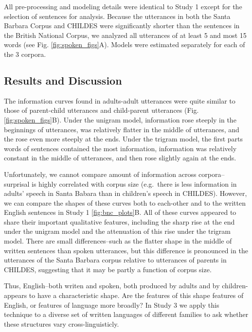 \documentclass[10pt, letterpaper]{article}
\begin{document}
All pre-processing and modeling details were identical to Study 1 except
for the selection of sentences for analysis. Because the utterances in
both the Santa Barbara Corpus and CHILDES were significantly shorter
than the sentences in the British National Corpus, we analyzed all
utterances of at least 5 and most 15 words (see Fig.
\ref{fig:spoken_figs}A). Models were estimated separately for each of
the 3 corpora.

\hypertarget{results-and-discussion-1}{%
\subsection{Results and Discussion}\label{results-and-discussion-1}}

The information curves found in adults-adult utterances were quite
similar to those of parent-child utterances and child-parent utterances
(Fig. \ref{fig:spoken_figs}B). Under the unigram model, information rose
steeply in the beginnings of utterances, was relatively flatter in the
middle of utterances, and the rose even more steeply at the ends. Under
the trigram model, the first parts words of sentences contained the most
information, information was relatively constant in the middle of
utterances, and then rose slightly again at the ends.

Unfortunately, we cannot compare amount of information across
corpora--surprisal is highly correlated with corpus size (e.g.~there is
less information in adults' speech in Santa Babara than in children's
speech in CHILDES). However, we can compare the shapes of these curves
both to each-other and to the written English sentences in Study 1
\ref{fig:bnc_plots}B. All of these curves appeared to share their
important qualitative features, including the sharp rise at the end
under the unigram model and the attenuation of this rise under the
trigram model. There are small differences--such as the flatter shape in
the middle of written sentences than spoken utterances, but this
difference is pronounced in the utterances of the Santa Barbara corpus
relative to utterances of parents in CHILDES, suggesting that it may be
partly a function of corpus size.

Thus, English--both writen and spoken, both produced by adults and by
children-appears to have a characteristic shape. Are the features of
this shape features of English, or features of language more broadly? In
Study 3 we apply this technique to a diverse set of written languages of
different families to ask whether these structures vary
cross-linguisticly.
\end{document}
